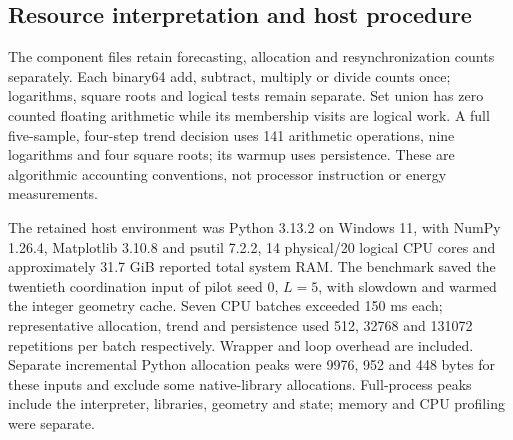 

\subsection{Resource interpretation and host procedure}
\begin{table}[htbp]\centering
\caption{Mean communication attempts and deliveries per run over 180 missions per policy. A message is one serialized datagram; kB is 1000 payload bytes. Failed attempts count, lower-layer headers do not. These descriptive means include unfinished runs.}

\end{table}

The component files retain forecasting, allocation and resynchronization counts separately. Each binary64 add, subtract, multiply or divide counts once; logarithms, square roots and logical tests remain separate. Set union has zero counted floating arithmetic while its membership visits are logical work. A full five-sample, four-step trend decision uses 141 arithmetic operations, nine logarithms and four square roots; its warmup uses persistence. These are algorithmic accounting conventions, not processor instruction or energy measurements.

\begin{table}[htbp]\centering
\caption{Component arithmetic workload and in-run CPU counters. Ops/run and GOP/run average 180 runs; per-decision values divide accumulated totals by executed decisions. Dashes mean no decisions. CPU counters can be below timer resolution, including displayed zeros; the separate repeated saved-input benchmark in the main text is the more reliable small-input timing comparison.}

\end{table}

The retained host environment was Python 3.13.2 on Windows 11, with NumPy 1.26.4, Matplotlib 3.10.8 and psutil 7.2.2, 14 physical/20 logical CPU cores and approximately 31.7 GiB reported total system RAM. The benchmark saved the twentieth coordination input of pilot seed 0, $L=5$, with slowdown and warmed the integer geometry cache. Seven CPU batches exceeded 150 ms each; representative allocation, trend and persistence used 512, 32768 and 131072 repetitions per batch respectively. Wrapper and loop overhead are included. Separate incremental Python allocation peaks were 9976, 952 and 448 bytes for these inputs and exclude some native-library allocations. Full-process peaks include the interpreter, libraries, geometry and state; memory and CPU profiling were separate.

